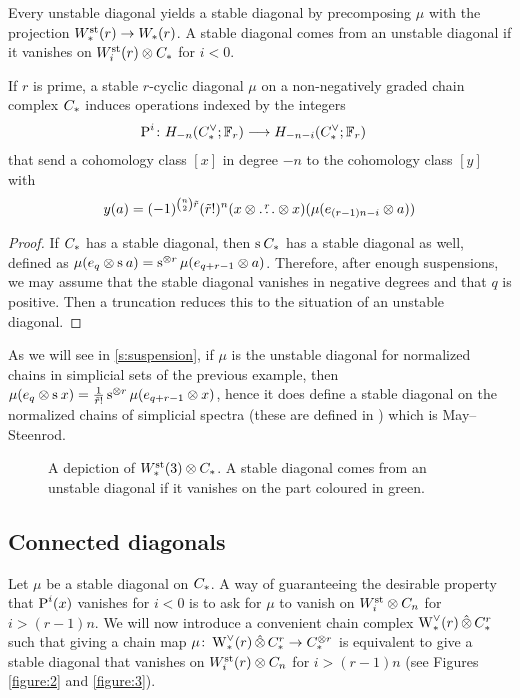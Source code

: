 Every unstable diagonal yields a stable diagonal by precomposing $\mu$ with the projection $\Wst(r) \to \W(r)$.
A stable diagonal comes from an unstable diagonal if it vanishes on $\Wst[i](r) \ot \ucadenas$ for $i<0$.

\begin{proposition}
	If $r$ is prime, a stable $r$-cyclic diagonal $\mu$ on a non-negatively graded chain complex $\ucadenas$ induces operations indexed by the integers
	\begin{align*}
		\power^{i} \colon H_{-n}(\ucocadenas;\mathbb{F}_r)& \lra H_{-n-i}(\ucocadenas;\mathbb{F}_r)
	\end{align*}
	that send a cohomology class $[x]$ in degree $-n$ to the cohomology class $[y]$ with
	\[
	y(a) = (-1)^{\binom{n}{2} \tilde{r}}(\tilde{r}!)^n(x \ot \overset{r}{\dots} \ot x)(\mu(e_{(r-1)n-i} \ot a))
	\]
\end{proposition}

\begin{proof}
	If $\ucadenas$ has a stable diagonal, then $\sus{} \ucadenas$ has a stable diagonal as well, defined as $\mu(e_q \ot \sus{} a) = \sus{\ot r}\mu(e_{q+r-1} \ot a)$.
	Therefore, after enough suspensions, we may assume that the stable diagonal vanishes in negative degrees and that $q$ is positive.
	Then a truncation reduces this to the situation of an unstable diagonal.
\end{proof}

\begin{example}
	As we will see in \cref{s:suspension}, if $\mu$ is the unstable diagonal for normalized chains in simplicial sets of the previous example, then $\mu(e_q \ot \sus{} x) = \frac{1}{\tilde{r}!}\sus{\ot r} \mu(e_{q+r-1} \ot x)$, hence it does define a stable diagonal on the normalized chains of simplicial spectra (these are defined in \cite{Gill2020}) which is May--Steenrod.
\end{example}

\begin{figure}
	
	\caption{A depiction of $\Wst(3) \ot \ucadenas$. A stable diagonal comes from an unstable diagonal if it vanishes on the part coloured in green.}
\end{figure}

\subsection{Connected diagonals}\label{s:connected}

Let $\mu$ be a stable diagonal on $\ucadenas$.
A way of guaranteeing the desirable property that $\power^i(x)$ vanishes for $i<0$ is to ask for $\mu$ to vanish on $\Wst[i] \ot \ucadenas[n]$ for $i>(r-1)n$.
We will now introduce a convenient chain complex $\rWd(r) \hotimes \rucadenas$ such that giving a chain map $\mu \colon \rWd(r)  \hotimes \rucadenas \to \ucadenas^{\ot r}$ is equivalent to give a stable diagonal that vanishes on $\Wst[i](r) \ot \ucadenas[n]$ for $i>(r-1)n$ (see Figures \ref{figure:2} and \ref{figure:3}).

